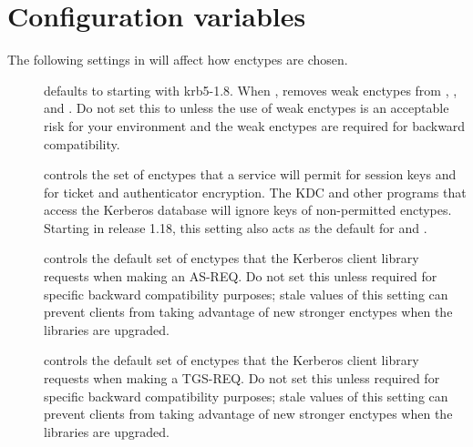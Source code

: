 \documentclass[letterpaper,10pt,english]{sphinxmanual}
\begin{document}
\section{Configuration variables}
\label{\detokenize{admin/enctypes:configuration-variables}}
The following \sphinxcode{{[}libdefaults{]}} settings in {\hyperref[\detokenize{admin/conf_files/krb5_conf:krb5-conf-5}]{}} will
affect how enctypes are chosen.
\begin{description}
\item[{}] \leavevmode
defaults to  starting with krb5-1.8.  When , removes
weak enctypes from ,
, and .  Do not
set this to  unless the use of weak enctypes is an
acceptable risk for your environment and the weak enctypes are
required for backward compatibility.

\item[{}] \leavevmode
controls the set of enctypes that a service will permit for
session keys and for ticket and authenticator encryption.  The KDC
and other programs that access the Kerberos database will ignore
keys of non-permitted enctypes.  Starting in release 1.18, this
setting also acts as the default for  and
.

\item[{}] \leavevmode
controls the default set of enctypes that the Kerberos client
library requests when making an AS-REQ.  Do not set this unless
required for specific backward compatibility purposes; stale
values of this setting can prevent clients from taking advantage
of new stronger enctypes when the libraries are upgraded.

\item[{}] \leavevmode
controls the default set of enctypes that the Kerberos client
library requests when making a TGS-REQ.  Do not set this unless
required for specific backward compatibility purposes; stale
values of this setting can prevent clients from taking advantage
of new stronger enctypes when the libraries are upgraded.

\end{description}
\end{document}
